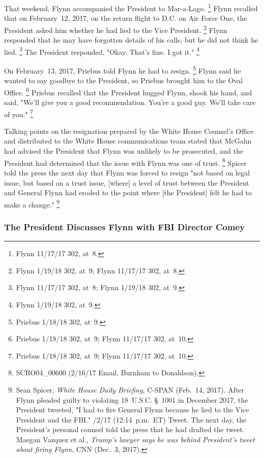 That weekend, Flynn accompanied the President to Mar-a-Lago.%
\footnote{Flynn 11/17/17 302, at~8.}
Flynn recalled that on February~12, 2017, on the return flight to D.C. on Air Force One, the President asked him whether he had lied to the Vice President.%
\footnote{Flynn 1/19/18 302, at~9;
Flynn 11/17/17 302, at~8.}
Flynn responded that he may have forgotten details of his calls, but he did not think he lied.%
\footnote{Flynn 11/17/17 302, at~8;
Flynn 1/19/18 302, at~9.}
The President responded, "Okay.
That's fine.
I got it."%
\footnote{Flynn 1/19/18 302, at~9.}

On February~13, 2017, Priebus told Flynn he had to resign.%
\footnote{Priebus 1/18/18 302, at~9.}
Flynn said he wanted to say goodbye to the President, so Priebus brought him to the Oval Office.%
\footnote{Priebus 1/18/18 302, at~9;
Flynn 11/17/17 302, at~10.}
Priebus recalled that the President hugged Flynn, shook his hand, and said, "We'll give you a good recommendation.
You're a good guy.
We'll take care of you."%
\footnote{Priebus 1/18/18 302, at~9;
Flynn 11/17/17 302, at~10.}

Talking points on the resignation prepared by the White House Counsel's Office and distributed to the White House communications team stated that McGahn had advised the President that Flynn was unlikely to be prosecuted, and the President had determined that the issue with Flynn was one of trust.%
\footnote{SCRO04\_00600 (2/16/17 Email, Burnham to Donaldson).}
Spicer told the press the next day that Flynn was forced to resign "not based on legal issue, but based on a trust issue, [where] a level of trust between the President and General Flynn had eroded to the point where [the President] felt he had to make a change."%
\footnote{Sean Spicer, \textit{White House Daily Briefing}, C-SPAN (Feb.~14, 2017).
After Flynn pleaded guilty to violating 18~U.S.C. \S~1001 in December 2017, the President tweeted, "I had to fire General Flynn because he lied to the Vice President and the FBI."
/2/17 (12:14~p.m.~ET) Tweet.
The next day, the President's personal counsel told the press that he had drafted the tweet.
Maegan Vazquez et al., \textit{Trump's lawyer says he was behind President's tweet about firing Flynn}, CNN (Dec.~3, 2017).}

\subsubsection{The President Discusses Flynn with FBI Director Comey}

